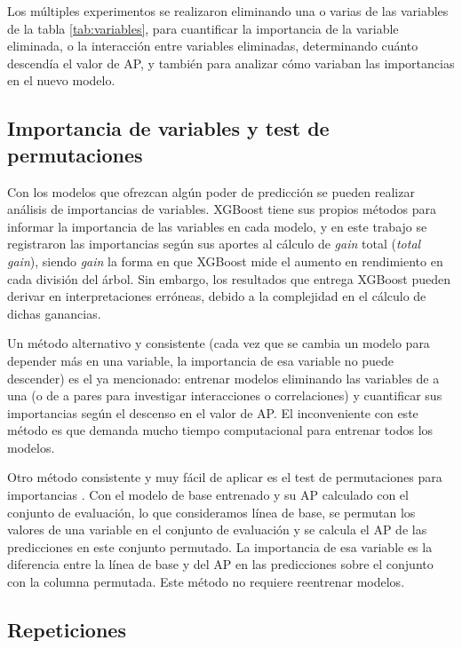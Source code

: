 \documentclass[a4paper,11pt,dvipsnames]{article}
\begin{document}
Los múltiples experimentos se realizaron eliminando una o varias de las variables de la tabla \ref{tab:variables}, para cuantificar la importancia de la variable eliminada, o la interacción entre variables eliminadas, determinando cuánto descendía el valor de AP, y también para analizar cómo variaban las importancias en el nuevo modelo.

\subsection{Importancia de variables y test de permutaciones}

Con los modelos que ofrezcan algún poder de predicción se pueden realizar análisis de importancias de variables. XGBoost tiene sus propios métodos para informar la importancia de las variables en cada modelo, y en este trabajo se registraron las importancias según sus aportes al cálculo de \textit{gain} total (\textit{total gain}), siendo \textit{gain} la forma en que XGBoost mide el aumento en rendimiento en cada división del árbol. Sin embargo, los resultados que entrega XGBoost pueden derivar en interpretaciones erróneas, debido a la complejidad en el cálculo de dichas ganancias.\par\medskip 

Un método alternativo y consistente (cada vez que se cambia un modelo para depender más en una variable, la importancia de esa variable no puede descender) es el ya mencionado: entrenar modelos eliminando las variables de a una (o de a pares para investigar interacciones o correlaciones) y cuantificar sus importancias según el descenso en el valor de AP. El inconveniente con este método es que demanda mucho tiempo computacional para entrenar todos los modelos.\par\medskip 

Otro método consistente y muy fácil de aplicar es el test de permutaciones para importancias \cite{AUC-based-permutation}. Con el modelo de base entrenado y su AP calculado con el conjunto de evaluación, lo que consideramos línea de base, se permutan los valores de una variable en el conjunto de evaluación y se calcula el AP de las predicciones en este conjunto permutado. La importancia de esa variable es la diferencia entre la línea de base y del AP en las predicciones sobre el conjunto con la columna permutada. Este método no requiere reentrenar modelos.

\subsection{Repeticiones}
\end{document}
